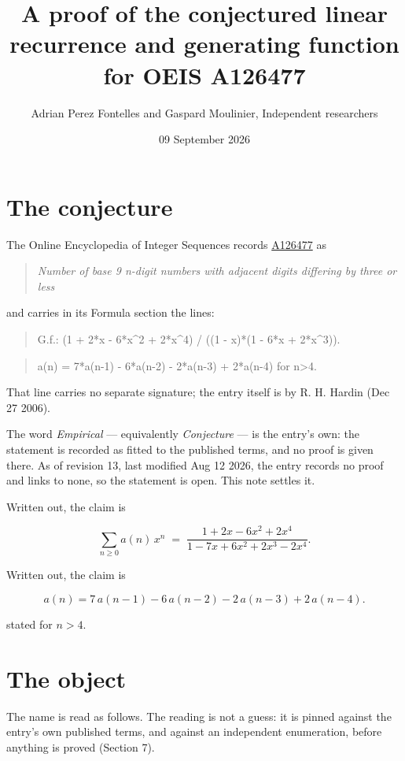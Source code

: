 \documentclass[11pt]{article}
\title{A proof of the conjectured linear recurrence and generating function for OEIS A126477}
\author{Adrian Perez Fontelles and Gaspard Moulinier, Independent researchers}
\date{09 September 2026}
\theoremstyle{definition}
\begin{document}
\maketitle
\section{The conjecture}

The Online Encyclopedia of Integer Sequences records \href{https://oeis.org/A126477}{A126477} as

\begin{quote}\itshape Number of base 9 n-digit numbers with adjacent digits differing by three or less\end{quote}

and carries in its Formula section the lines:

\begin{quote}\ttfamily G.f.: (1 + 2*x - 6*x\textasciicircum{}2 + 2*x\textasciicircum{}4) / ((1 - x)*(1 - 6*x + 2*x\textasciicircum{}3)).\end{quote}

\begin{quote}\ttfamily a(n) = 7*a(n-1) - 6*a(n-2) - 2*a(n-3) + 2*a(n-4) for n>4.\end{quote}

That line carries no separate signature; the entry itself is by R. H. Hardin (Dec 27 2006).

The word {\itshape Empirical} --- equivalently {\itshape Conjecture} --- is the entry's own: the statement is recorded as fitted to the published terms, and no proof is given there. As of revision 13, last modified Aug 12 2026, the entry records no proof and links to none, so the statement is open. This note settles it.

Written out, the claim is

\[\sum_{n \ge 0} a(n)\,x^n \;=\; \frac{1 + 2x - 6x^{2} + 2x^{4}}{1 - 7x + 6x^{2} + 2x^{3} - 2x^{4}}.\]

Written out, the claim is

\[a(n) = 7\,a(n-1) - 6\,a(n-2) - 2\,a(n-3) + 2\,a(n-4).\]

stated for $n > 4$.

\section{The object}

The name is read as follows. The reading is not a guess: it is pinned against the entry's own published terms, and against an independent enumeration, before anything is proved (Section 7).
\end{document}
